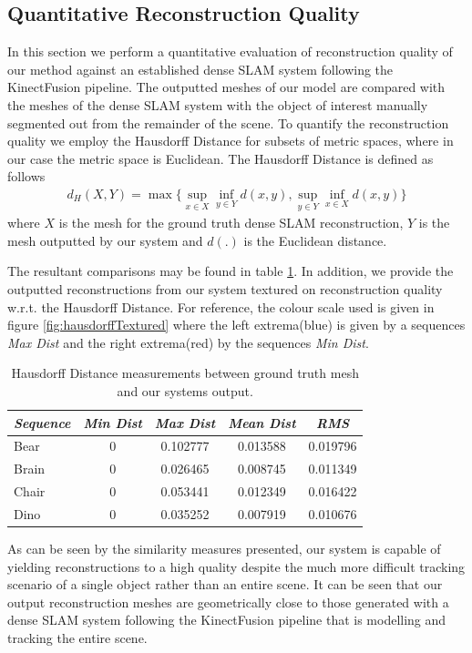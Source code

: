 \subsection{Quantitative Reconstruction Quality}
In this section we perform a quantitative evaluation of reconstruction quality of our method against an established dense SLAM system \cite{Prisacariu2014} following the KinectFusion \cite{Newcombe2011} pipeline.
The outputted meshes of our model are compared with the meshes of the dense SLAM system with the object of interest manually segmented out from the remainder of the scene. To quantify the reconstruction quality 
we employ the Hausdorff Distance \cite{Hausdorff} for subsets of metric spaces, where in our case the metric space is Euclidean. The Hausdorff Distance is defined as follows
\begin{equation}
\begin{split}
d_{H}(X, Y) = \max \Bigg \{ \sup_{x \in X} \inf_{y \in Y} d(x, y), \sup_{y \in Y} \inf_{x \in X} d(x, y) \Bigg \}
\end{split}
\end{equation}
where $X$ is the mesh for the ground truth dense SLAM reconstruction, $Y$ is the mesh outputted by our system and $d(.)$ is the Euclidean distance.

The resultant comparisons may be found in table \ref{hausdorffTable}. In addition, we provide the outputted reconstructions from our system textured on reconstruction quality w.r.t. the Hausdorff Distance. 
For reference, the colour scale used is given in figure \ref{fig:hausdorffTextured} where the left extrema(blue) is given by a sequences \textit{Max Dist} and the right extrema(red) by the sequences \textit{Min Dist}. 
\begin{table}[!t]
	{
		\footnotesize
		\begin{center}
			\begin{tabular}{l c c c c}
				\emph{Sequence} & \emph{Min Dist} & \emph{Max Dist} & \emph{Mean Dist} & \emph{RMS}\\
				\midrule
				\textsf{Bear} & 0 & 0.102777 & 0.013588 & 0.019796 \\
				\textsf{Brain} & 0 & 0.026465 & 0.008745 & 0.011349 \\
				\textsf{Chair} & 0 & 0.053441 & 0.012349 & 0.016422 \\
				\textsf{Dino} & 0 & 0.035252 & 0.007919 & 0.010676
			\end{tabular}
		\end{center}
	}
\vspace{-3mm}
	\caption{Hausdorff Distance measurements between ground truth mesh and our systems output.}
	\label{hausdorffTable}
\end{table}
As can be seen by the similarity measures presented, our system is capable of yielding reconstructions to a high quality despite the much more difficult tracking scenario of a single object rather than an entire 
scene. It can be seen that our output reconstruction meshes are geometrically close to those generated with a dense SLAM system \cite{Prisacariu2014} following the KinectFusion \cite{Newcombe2011} pipeline that 
is modelling and tracking the entire scene.

